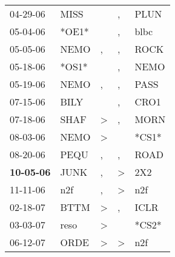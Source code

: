 \begin{supertabular}{p{0.07\textwidth}p{0.06\textwidth}p{0.02\textwidth}p{0.02\textwidth}p{0.06\textwidth}}
          04-29-06\textsuperscript{} &           MISS\textsuperscript{} &                  &                , &           PLUN\textsuperscript{} \\
          05-04-06\textsuperscript{} &                            *OE1* &                  &                , &           blbc\textsuperscript{} \\
          05-05-06\textsuperscript{} &           NEMO\textsuperscript{} &                , &                , &           ROCK\textsuperscript{} \\
          05-18-06\textsuperscript{} &                            *OS1* &                  &                , &           NEMO\textsuperscript{} \\
          05-19-06\textsuperscript{} &           NEMO\textsuperscript{} &                , &                , &           PASS\textsuperscript{} \\
          07-15-06\textsuperscript{} &           BILY\textsuperscript{} &                  &                , &           CRO1\textsuperscript{} \\
          07-18-06\textsuperscript{} &           SHAF\textsuperscript{} &     \textgreater &                , &           MORN\textsuperscript{} \\
          08-03-06\textsuperscript{} &           NEMO\textsuperscript{} &     \textgreater &                  &                            *CS1* \\
          08-20-06\textsuperscript{} &           PEQU\textsuperscript{} &                , &                , &           ROAD\textsuperscript{} \\
 \textbf{10-05-06\textsuperscript{}} &           JUNK\textsuperscript{} &                , &     \textgreater &            2X2\textsuperscript{} \\
          11-11-06\textsuperscript{} &            n2f\textsuperscript{} &                , &     \textgreater &            n2f\textsuperscript{} \\
          02-18-07\textsuperscript{} &           BTTM\textsuperscript{} &     \textgreater &                , &           ICLR\textsuperscript{} \\
          03-03-07\textsuperscript{} &           reso\textsuperscript{} &     \textgreater &                  &                            *CS2* \\
          06-12-07\textsuperscript{} &           ORDE\textsuperscript{} &     \textgreater &     \textgreater &            n2f\textsuperscript{} \\

\end{supertabular}
